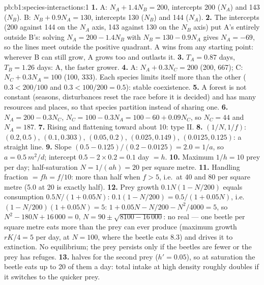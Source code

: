 \begin{solution}{pb:b1:species-interactions:1}
\textbf{1.} A: $N_A + 1.4 N_B = 200$, intercepts 200 ($N_A$) and 143
($N_B$). B: $N_B + 0.9 N_A = 130$, intercepts 130 ($N_B$) and 144
($N_A$).
\textbf{2.} The intercepts (200 against 144 on the $N_A$ axis, 143
against 130 on the $N_B$ axis) put A's  entirely outside B's:
solving $N_A = 200 - 1.4 N_B$ with $N_B = 130 - 0.9 N_A$ gives $N_A = -69$,
so the lines meet outside the positive quadrant. A wins from any starting
point: wherever B can still grow, A grows too and outlasts it.
\textbf{3.} $T_A = 0.87$ days, $T_B = 1.26$ days: A, the faster
grower.
\textbf{4.} A: $N_A + 0.3 N_C = 200$ (200, 667); C: $N_C + 0.3 N_A =
100$ (100, 333). Each species limits itself more than the other
($0.3 < 200/100$ and $0.3 < 100/200 = 0.5$): stable coexistence.
\textbf{5.} A forest is not constant (seasons, disturbances reset the
race before it is decided) and has many resources and places, so
that species partition  instead of sharing one.
\textbf{6.} $N_A = 200 - 0.3 N_C$, $N_C = 100 - 0.3 N_A = 100 - 60 +
0.09 N_C$, so $N_C = 44$ and $N_A = 187$.
\textbf{7.} Rising and flattening toward about 10: type II.
\textbf{8.} $(1/N, 1/f)$: $(0.2, 0.5)$, $(0.1, 0.303)$, $(0.05, 0.2)$,
$(0.025, 0.149)$, $(0.0125, 0.125)$: a straight line.
\textbf{9.} Slope $(0.5 - 0.125)/(0.2 - 0.0125) = 2.0 = 1/a$, so $a =
\qty{0.5}{m^2/d}$; intercept $0.5 - 2\times 0.2 = 0.1$ day $= h$.
\textbf{10.} Maximum $1/h = 10$ prey per day; half-saturation $N =
1/(ah) = 20$ per square metre.
\textbf{11.} Handling fraction $= f h = f/10$: more than half when $f
> 5$, i.e.\ at 40 and 80 per square metre (5.0 at 20 is exactly half).
\textbf{12.} Prey growth $0.1 N (1 - N/200)$ equals consumption
$0.5N/(1 + 0.05N)$: $0.1(1 - N/200) = 0.5/(1 + 0.05 N)$, i.e.\
$(1 - N/200)(1 + 0.05N) = 5$: $1 + 0.05N - N/200 - N^2/4000 = 5$, so
$N^2 - 180 N + 16\,000 = 0$, $N = 90 \pm \sqrt{8100 - 16\,000}$: no
real \omterm{def:b1:flowering-plant-organization:organs}{root} --- one beetle per square metre eats more than the prey can
ever produce (maximum growth $rK/4 = 5$ per day, at $N = 100$, where
the beetle eats 8.3) and drives it to extinction. No equilibrium; the
prey persists only if the beetles are fewer or the prey has refuges.
\textbf{13.}  halves for the second prey ($h' = 0.05$),
so at saturation the beetle eats up to 20 of them a day: total intake
at high density roughly doubles if it switches to the quicker prey.

\end{solution}
